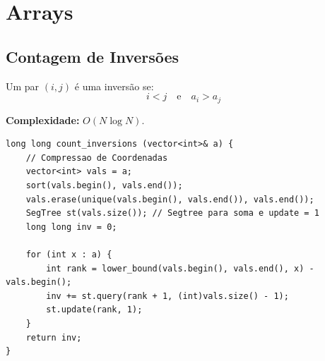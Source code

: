 \section{Arrays}



\subsection{Contagem de Inversões}

Um par $(i,j)$ é uma inversão se:
\[
i < j \quad\text{e}\quad a_i > a_j
\]

\textbf{Complexidade:} $O(N\log N)$.

\begin{lstlisting}
long long count_inversions (vector<int>& a) {
    // Compressao de Coordenadas
    vector<int> vals = a;
    sort(vals.begin(), vals.end());
    vals.erase(unique(vals.begin(), vals.end()), vals.end());
    SegTree st(vals.size()); // Segtree para soma e update = 1
    long long inv = 0;

    for (int x : a) {
        int rank = lower_bound(vals.begin(), vals.end(), x) - vals.begin();
        inv += st.query(rank + 1, (int)vals.size() - 1); 
        st.update(rank, 1);
    }
    return inv;
}
\end{lstlisting}